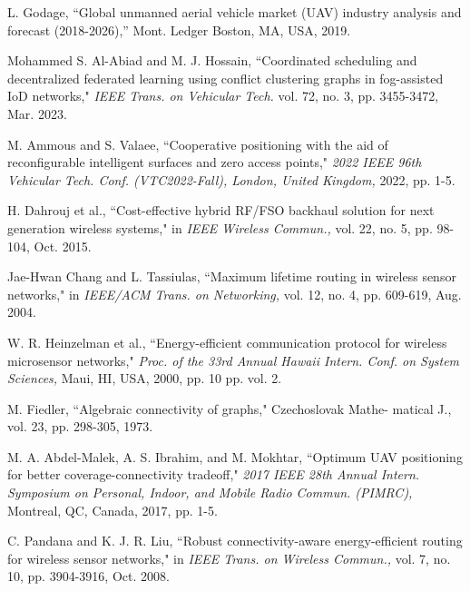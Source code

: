 \documentclass[conference]{IEEEtran}
\begin{document}
 
\begin{thebibliography}{00}
L. Godage, ``Global unmanned aerial vehicle market (UAV) industry analysis and forecast (2018-2026),'' Mont. Ledger Boston, MA, USA, 2019.

Mohammed S. Al-Abiad and M. J. Hossain, ``Coordinated scheduling and decentralized federated learning using conflict clustering graphs in fog-assisted IoD networks," \emph{IEEE Trans. on Vehicular Tech.} vol. 72, no. 3, pp. 3455-3472, Mar. 2023.

M. Ammous and S. Valaee, ``Cooperative positioning with the aid of reconfigurable intelligent surfaces and zero access points," \emph{2022 IEEE 96th Vehicular Tech. Conf. (VTC2022-Fall), London, United Kingdom,} 2022, pp. 1-5.

H. Dahrouj et al., ``Cost-effective hybrid RF/FSO backhaul solution for next generation wireless systems," in \emph{IEEE Wireless Commun.,} vol. 22, no. 5, pp. 98-104, Oct. 2015.

 Jae-Hwan Chang and L. Tassiulas, ``Maximum lifetime routing in wireless sensor networks," in \emph{IEEE/ACM Trans. on Networking,} vol. 12, no. 4, pp. 609-619, Aug. 2004.  


 W. R. Heinzelman et al., ``Energy-efficient communication protocol for wireless microsensor networks," \emph{Proc. of the 33rd Annual Hawaii Intern. Conf. on System Sciences,} Maui, HI, USA, 2000, pp. 10 pp. vol. 2.

M. Fiedler, ``Algebraic connectivity of graphs," Czechoslovak Mathe- matical J., vol. 23, pp. 298-305, 1973.

M. A. Abdel-Malek, A. S. Ibrahim, and M. Mokhtar, ``Optimum UAV positioning for better coverage-connectivity tradeoff," \emph{2017 IEEE 28th Annual Intern. Symposium on Personal, Indoor, and Mobile Radio Commun. (PIMRC),} Montreal, QC, Canada, 2017, pp. 1-5.

 C. Pandana and K. J. R. Liu, ``Robust connectivity-aware energy-efficient routing for wireless sensor networks," in \emph{IEEE Trans. on Wireless Commun.,} vol. 7, no. 10, pp. 3904-3916, Oct. 2008.



\end{thebibliography}
\end{document}
